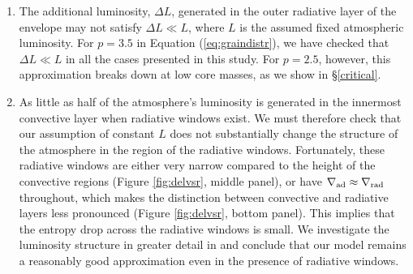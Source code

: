 \begin{enumerate}

 \item The additional luminosity, $\Delta L$, generated in the outer radiative layer of the envelope may not satisfy $\Delta L \ll L$, where $L$ is the assumed fixed atmospheric luminosity. For $p=3.5$ in Equation (\ref{eq:graindistr}), we have checked that $\Delta L \ll L$ in all the cases presented in this study. For $p=2.5$, however, this approximation breaks down at low core masses, as we show in \S\ref{critical}.
 
  


\item As little as half of the atmosphere's luminosity is generated in the innermost convective layer when radiative windows exist.   We must therefore check that our assumption of constant $L$ does not substantially change the structure of the atmosphere in the region of the radiative windows. Fortunately, these radiative windows are either very narrow compared to the height of the convective regions (Figure \ref{fig:delvsr}, middle panel), or  have $\nabla_{\rm ad} \approx \nabla_{\rm rad}$ throughout, which makes the distinction between convective and radiative layers less  pronounced (Figure \ref{fig:delvsr}, bottom panel). This implies that the entropy drop across the radiative windows is small. We investigate the luminosity structure in greater detail in  and conclude that our model remains a reasonably good approximation even in the presence of radiative windows.


\end{enumerate}
